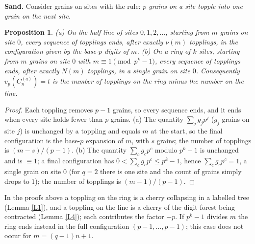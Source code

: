 \documentclass[11pt]{article}
\newtheorem{proposition}{Proposition}
\theoremstyle{remark}
\newcommand{\C}{C_n^{(q)}}
\begin{document}
\textbf{Sand.} Consider grains on sites with the rule: \emph{$p$ grains on a site topple into
one grain on the next site.}
\begin{proposition}
\textup{(a)} On the half-line of sites $0,1,2,\dots$, starting from $m$ grains on site $0$, every
sequence of topplings ends, after exactly $\nu(m)$ topplings, in the configuration given by
the base-$p$ digits of $m$.
\textup{(b)} On a ring of $k$ sites, starting from $m$ grains on site $0$ with
$m\equiv1\pmod{p^k-1}$, every sequence of topplings ends, after exactly $N(m)$ topplings, in
a single grain on site $0$.
Consequently $v_p(\C)=t$ is the number of topplings on the ring minus the number on the line.
\end{proposition}
\begin{proof}
Each toppling removes $p-1$ grains, so every sequence ends, and it ends when every site holds
fewer than $p$ grains. (a) The quantity $\sum_jg_jp^j$ ($g_j$ grains on site $j$) is unchanged
by a toppling and equals $m$ at the start, so the final configuration is the base-$p$
expansion of $m$, with $s$ grains; the number of topplings is $(m-s)/(p-1)$. (b) The quantity
$\sum_cg_cp^c$ modulo $p^k-1$ is unchanged and is $\equiv1$; a final configuration has
$0<\sum_cg_cp^c\le p^k-1$, hence $\sum_cg_cp^c=1$, a single grain on site $0$ (for $q=2$ there
is one site and the count of grains simply drops to $1$); the number of topplings is
$(m-1)/(p-1)$.
\end{proof}
In the proofs above a toppling on the ring is a cherry collapsing in a labelled tree (Lemma
\ref{L1}), and a toppling on the line is a cherry of the digit forest being contracted (Lemma
\ref{L4}); each contributes the factor $-p$. If $p^k-1$ divides $m$ the ring ends instead in
the full configuration $(p-1,\dots,p-1)$; this case does not occur for $m=(q-1)n+1$.
\end{document}
